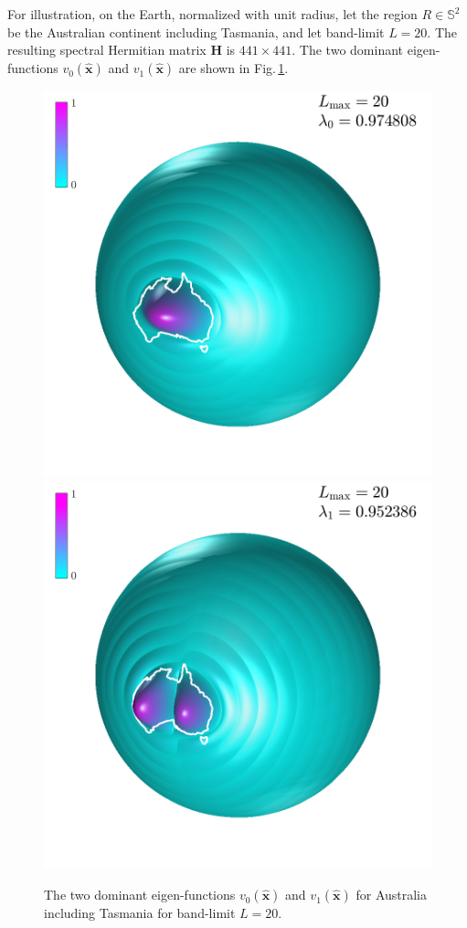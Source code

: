 \documentclass[10pt, twocolumn, twoside]{IEEEtran}
\newcommand{\untsph}{\mathbb{S}^{2}} %
\newcommand{\unit}[1]{\widehat{\bm{#1}}}
\begin{document}
For illustration, on the Earth, normalized with unit radius, let the region $R\in\untsph$ be the Australian continent including Tasmania, and let band-limit $L=20$.  The resulting spectral Hermitian matrix $\mathbf{H}$ is $441\times441$. The two dominant eigen-functions $v^{}_{0}(\unit{x})$ and $v^{}_{1}(\unit{x})$ are shown in Fig.\,\ref{fig:region}.

\begin{figure}[htb]
\centering
	\includegraphics[width=0.65\columnwidth]{pdfs/australia_0020_0001.png}\\[-5mm]
	\includegraphics[width=0.65\columnwidth]{pdfs/australia_0020_0002.png}
	\caption{The two dominant eigen-functions $v^{}_{0}(\unit{x})$ and $v^{}_{1}(\unit{x})$ for Australia including Tasmania for band-limit $L=20$.}\label{fig:region}
\end{figure}


\quad
\newpage
\end{document}
